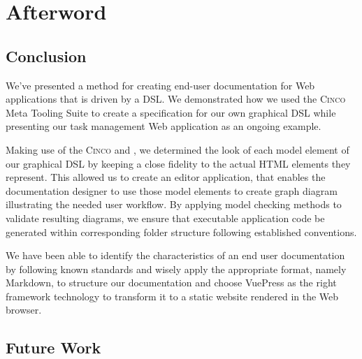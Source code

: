 \chapter{Afterword}\label{ch:epilogue}

\section{Conclusion}\label{sec:concl}

We've presented a method for creating end-user documentation for Web applications that is driven by a DSL. We demonstrated how we used the \textsc{Cinco} Meta Tooling Suite to create a specification for our own graphical DSL while presenting our task management Web application as an ongoing example.

Making use of the \textsc{Cinco}  and , we determined the look of each model element of our graphical DSL by keeping a close fidelity to the actual HTML elements they represent. This allowed us to create an editor application, that enables the documentation designer to use those model elements to create graph diagram illustrating the needed user workflow. By applying model checking methods to validate resulting diagrams, we ensure that executable application code be generated within corresponding folder structure following established conventions.

We have been able to identify the characteristics of an end user documentation by following known standards and wisely apply the appropriate format, namely Markdown, to structure our documentation and choose VuePress as the right framework technology to transform it to a static website rendered in the Web browser.

\section{Future Work}\label{sec:futwork}

